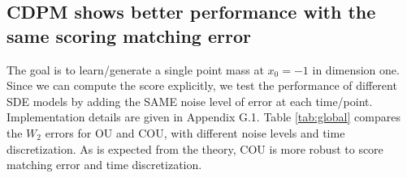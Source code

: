 \documentclass[letterpaper,10pt,reqno]{amsart}
\numberwithin{equation}{section}
\begin{document}
\subsection{CDPM shows better performance with the same scoring matching error} 
\label{sc41}
The goal is to learn/generate a single point mass at $x_0=-1$ in dimension one.
Since we can compute the score explicitly, 
we test the performance of different SDE models by adding the SAME noise level of error at each time/point.
Implementation details are given in Appendix G.1.
Table \ref{tab:global} compares the $W_2$ errors for OU and COU, 
with different noise levels and time discretization.
As is expected from the theory, COU is more robust to score matching error and time discretization.
\end{document}
